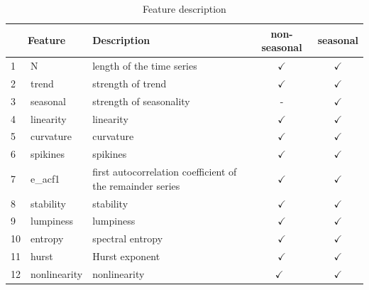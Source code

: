 \documentclass[11pt,a4paper,]{article}
\theoremstyle{definition}
\theoremstyle{definition}
\theoremstyle{definition}
\theoremstyle{remark}
\begin{document}
\begin{table}[!p]
\centering\small
\caption{Feature description}
\label{feature}
\begin{tabular}{llp{7.5cm}cc}
\toprule
\multicolumn{2}{c}{Feature} & Description & non-seasonal &  seasonal\\ 
\midrule
1  & N              & length of the time series                                                                        & $\checkmark$  & $\checkmark$ \\
2  & trend          & strength of trend                                                                                & $\checkmark$  & $\checkmark$\\
3  & seasonal       & strength of seasonality                                                                          & -             & $\checkmark$ \\
4  & linearity      & linearity                                                                                        & $\checkmark$  & $\checkmark$ \\
5  & curvature      & curvature                                                                                        & $\checkmark$  & $\checkmark$ \\
6  & spikines       & spikines                                                                                         & $\checkmark$  & $\checkmark$ \\
7  & e\_acf1        & first autocorrelation coefficient of the remainder series                                        & $\checkmark$  & $\checkmark$ \\
8  & stability      & stability                                                                                        & $\checkmark$  & $\checkmark$ \\
9  & lumpiness      & lumpiness                                                                                        & $\checkmark$  & $\checkmark$ \\
10 & entropy        & spectral entropy                                                                                 & $\checkmark$  & $\checkmark$ \\
11 & hurst          & Hurst exponent                                                                                   & $\checkmark$  & $\checkmark$ \\
12 & nonlinearity   & nonlinearity                                                                                     & $\checkmark$\ & $\checkmark$ \\

\end{tabular}
\end{table}
\end{document}
